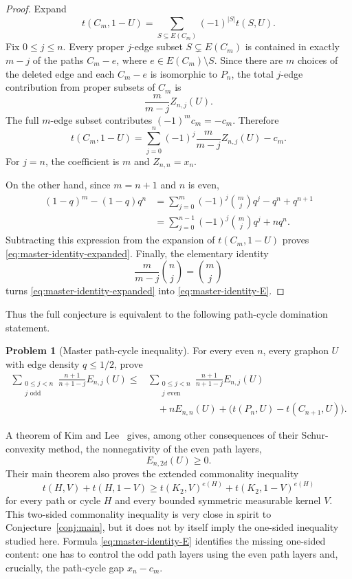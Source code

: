 \documentclass[11pt]{article}
\theoremstyle{definition}
\newtheorem{problem}[theorem]{Problem}
\theoremstyle{remark}
\begin{document}
\begin{proof}
Expand
\[
  t(C_m,1-U)=\sum_{S\subseteq E(C_m)}(-1)^{|S|}t(S,U).
\]
Fix $0\le j\le n$.  Every proper $j$-edge subset $S\subsetneq E(C_m)$ is contained in exactly $m-j$ of the paths $C_m-e$, where $e\in E(C_m)\setminus S$.  Since there are $m$ choices of the deleted edge and each $C_m-e$ is isomorphic to $P_n$, the total $j$-edge contribution from proper subsets of $C_m$ is
\[
  \frac{m}{m-j}Z_{n,j}(U).
\]
The full $m$-edge subset contributes $(-1)^m c_m=-c_m$.  Therefore
\[
  t(C_m,1-U)
  =
  \sum_{j=0}^{n}(-1)^j\frac{m}{m-j}Z_{n,j}(U)-c_m.
\]
For $j=n$, the coefficient is $m$ and $Z_{n,n}=x_n$.

On the other hand, since $m=n+1$ and $n$ is even,
\begin{align*}
  (1-q)^m-(1-q)q^n
  &=\sum_{j=0}^{m}(-1)^j\binom mj q^j-q^n+q^{n+1} \\
  &=\sum_{j=0}^{n-1}(-1)^j\binom mj q^j+nq^n.
\end{align*}
Subtracting this expression from the expansion of $t(C_m,1-U)$ proves \eqref{eq:master-identity-expanded}.  Finally, the elementary identity
\[
  \frac{m}{m-j}\binom nj=\binom mj
\]
turns \eqref{eq:master-identity-expanded} into \eqref{eq:master-identity-E}.
\end{proof}

Thus the full conjecture is equivalent to the following path-cycle domination statement.

\begin{problem}[Master path-cycle inequality]\label{prob:master-path-cycle}
For every even $n$, every graphon $U$ with edge density $q\le1/2$, prove
\begin{equation}\label{eq:master-path-cycle-problem}
\begin{aligned}
\sum_{\substack{0\le j<n\\ j\text{ odd}}}
\frac{n+1}{n+1-j}E_{n,j}(U)
\le{}&
\sum_{\substack{0\le j<n\\ j\text{ even}}}
\frac{n+1}{n+1-j}E_{n,j}(U) \\
&\quad+nE_{n,n}(U)+\bigl(t(P_n,U)-t(C_{n+1},U)\bigr).
\end{aligned}
\end{equation}
\end{problem}

A theorem of Kim and Lee~\cite{KimLee} gives, among other consequences of their Schur-convexity method, the nonnegativity of the even path layers,
\[
  E_{n,2d}(U)\ge0.
\]
Their main theorem also proves the extended commonality inequality
\[
  t(H,V)+t(H,1-V)
  \ge t(K_2,V)^{e(H)}+t(K_2,1-V)^{e(H)}
\]
for every path or cycle $H$ and every bounded symmetric measurable kernel $V$.  This two-sided commonality inequality is very close in spirit to Conjecture~\ref{conj:main}, but it does not by itself imply the one-sided inequality studied here.  Formula \eqref{eq:master-identity-E} identifies the missing one-sided content: one has to control the odd path layers using the even path layers and, crucially, the path-cycle gap $x_n-c_m$.
\end{document}

